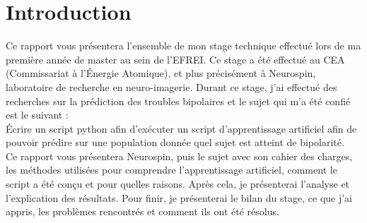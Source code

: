\chapter*{Introduction}

Ce rapport vous présentera l'ensemble de mon stage technique effectué lors de ma première année de master au sein de l'EFREI. Ce stage a été effectué au CEA (Commissariat à l'Énergie Atomique), et plus précisément à Neurospin, laboratoire de recherche en neuro-imagerie. 
Durant ce stage, j'ai effectué des recherches sur la prédiction des troubles bipolaires et le sujet qui m'a été confié est le suivant : \\

Écrire un script python afin d'exécuter un script d'apprentissage artificiel afin de pouvoir prédire sur une population donnée quel sujet est atteint de bipolarité. \\


Ce rapport vous présentera Neurospin, puis le sujet avec son cahier des charges, les méthodes utilisées pour comprendre l'apprentissage artificiel, comment le script a été conçu et pour quelles raisons.
Après cela, je présenterai l'analyse et l'explication des résultats.
Pour finir, je présenterai le bilan du stage, ce que j'ai appris, les problèmes rencontrés et comment ils ont été résolus. 

